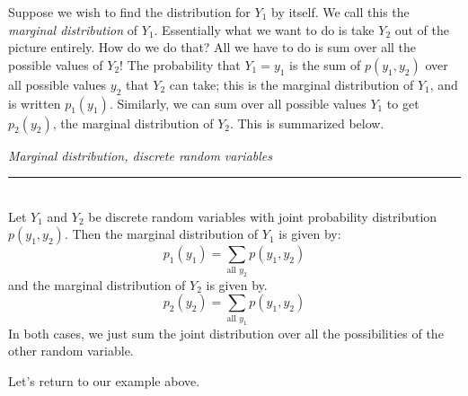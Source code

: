 \documentclass[notes.tex]{subfiles}
\begin{document}
Suppose we wish to find the distribution for $Y_1$ by itself. We call this the \emph{marginal distribution} of $Y_1$. Essentially what we want to do is take $Y_2$ out of the picture entirely. How do we do that? All we have to do is sum over all the possible values of $Y_2$! The probability that $Y_1 = y_1$ is the sum of $p(y_1, y_2)$ over all possible values $y_2$ that $Y_2$ can take; this is the marginal distribution of $Y_1$, and is written $p_1(y_1)$. Similarly, we can sum over all possible values $Y_1$ to get $p_2(y_2)$, the marginal distribution of $Y_2$. This is summarized below.

\begin{framed}
\emph{Marginal distribution, discrete random variables}\\
  \rule{\dimexpr{}\fboxrule}{.1pt} \\
Let $Y_1$ and $Y_2$ be discrete random variables with joint probability distribution $p(y_1, y_2)$. Then the marginal distribution of $Y_1$ is given by:
\[
p_1(y_1) = \sum_{\text{all } y_2} p(y_1, y_2)
\]
and the marginal distribution of $Y_2$ is given by.
\[
p_2(y_2) = \sum_{\text{all } y_1} p(y_1, y_2)
\]
In both cases, we just sum the joint distribution over all the possibilities of the other random variable.
\end{framed}

Let's return to our example above.
\end{document}
